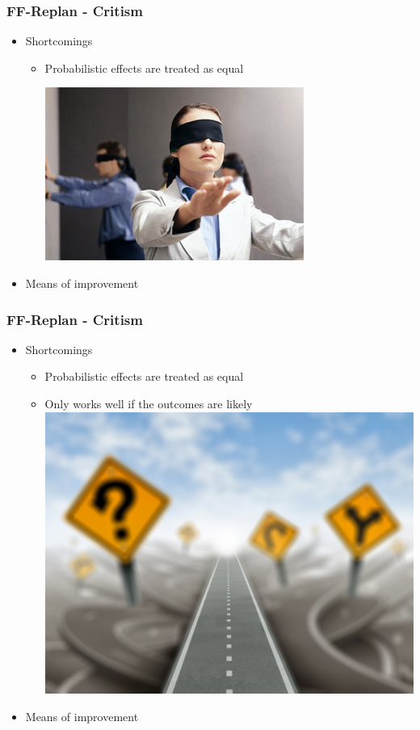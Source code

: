 \documentclass{beamer}
\let\origframetitle=\frametitle
\renewcommand\frametitle[1]{\origframetitle{\textbf{\large{\textrm{#1}}}}}
\begin{document}
\begin{frame}
  \frametitle{FF-Replan - Critism}

  \begin{itemize}
    \item Shortcomings
	\begin{itemize}
        	\item Probabilistic effects are treated as equal

\includegraphics[scale=0.5]{images/blindfold.jpg}

	\end{itemize}
   \item Means of improvement
   \end{itemize}
\end{frame}

\begin{frame}
  \frametitle{FF-Replan - Critism}

  \begin{itemize}
    \item Shortcomings
	\begin{itemize}
        	\item Probabilistic effects are treated as equal
	\item Only works well if the outcomes are likely
\includegraphics[scale=0.5]{images/direction-road-maze.jpg}
	\end{itemize}
   \item Means of improvement

   \end{itemize}
\end{frame}
\end{document}
